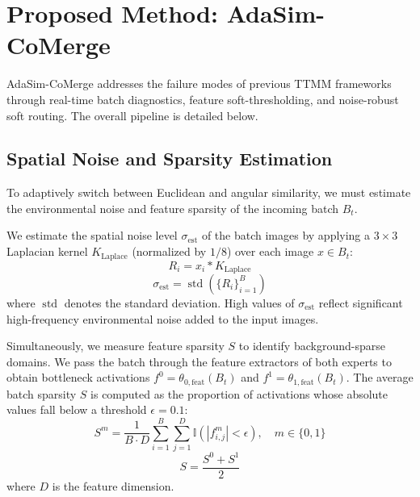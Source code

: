 \documentclass{article}
\theoremstyle{plain}
\theoremstyle{definition}
\theoremstyle{remark}
\begin{document}
\section{Proposed Method: AdaSim-CoMerge}
\label{sec:method}

AdaSim-CoMerge addresses the failure modes of previous TTMM frameworks through real-time batch diagnostics, feature soft-thresholding, and noise-robust soft routing. The overall pipeline is detailed below.

\subsection{Spatial Noise and Sparsity Estimation}
To adaptively switch between Euclidean and angular similarity, we must estimate the environmental noise and feature sparsity of the incoming batch $B_t$. 

We estimate the spatial noise level $\sigma_{\text{est}}$ of the batch images by applying a $3 \times 3$ Laplacian kernel $K_{\text{Laplace}}$ (normalized by $1/8$) over each image $x \in B_t$:
\begin{equation}
    R_{i} = x_i * K_{\text{Laplace}}
\end{equation}
\begin{equation}
    \sigma_{\text{est}} = \operatorname{std}(\{R_i\}_{i=1}^B)
\end{equation}
where $\operatorname{std}$ denotes the standard deviation. High values of $\sigma_{\text{est}}$ reflect significant high-frequency environmental noise added to the input images.

Simultaneously, we measure feature sparsity $S$ to identify background-sparse domains. We pass the batch through the feature extractors of both experts to obtain bottleneck activations $f^0 = \theta_{0,\text{feat}}(B_t)$ and $f^1 = \theta_{1,\text{feat}}(B_t)$. The average batch sparsity $S$ is computed as the proportion of activations whose absolute values fall below a threshold $\epsilon = 0.1$:
\begin{equation}
    S^m = \frac{1}{B \cdot D} \sum_{i=1}^B \sum_{j=1}^D \mathbb{I}(|f^m_{i,j}| < \epsilon), \quad m \in \{0, 1\}
\end{equation}
\begin{equation}
    S = \frac{S^0 + S^1}{2}
\end{equation}
where $D$ is the feature dimension.
\end{document}
